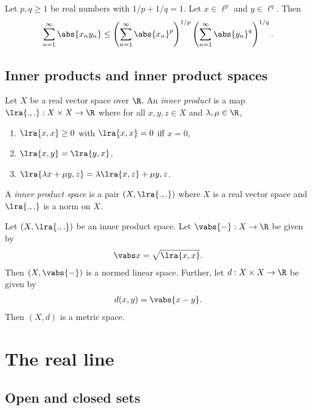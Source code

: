 \documentclass{article}
\begin{document}
\begin{lemma}
	Let $p,q\geq 1$ be real numbers with $1/p+1/q=1$. Let $x\in \ell^p$ and $y\in \ell^q$. Then
	\begin{align*}
		\sum_{n=1}^\infty \abs{x_ny_n}\leq
		\left(\sum_{n=1}^\infty\abs{x_n}^p\right)^{1/p}
		\left(\sum_{n=1}^\infty\abs{y_n}^q\right)^{1/q}.
	\end{align*}
\end{lemma}

\subsection{Inner products and inner product spaces}

\begin{definition}
	Let $X$ be a real vector space over $\R$. An \emph{inner product}
	is a map $\lra{.,.}:X\times X\to\R$ where for all $x,y,z\in X$ and
	$\lambda,\mu\in\R$,
	\begin{enumerate}
		\item $\lra{x,x}\geq 0$ with $\lra{x,x}=0$ iff $x=0$,
		\item $\lra{x,y}=\lra{y,x}$,
		\item $\lra{\lambda x+\mu y,z}=\lambda\lra{x,z}+\mu{y,z}$.
	\end{enumerate}
	A \emph{inner product space} is a pair $(X, \lra{.,.})$ where $X$ is a real
	vector space and $\lra{.,.}$ is a norm on $X$.
\end{definition}

\begin{lemma}
	Let $(X,\lra{.,.})$ be an inner product space. Let $\vabs{-}:X\to\R$ be given
	by
	\begin{align*}
		\vabs x = \sqrt{\lra{x,x}}.
	\end{align*}
	Then $(X,\vabs{-})$ is a normed linear space. Further, let $d:X\times X\to\R$
	be given by
	\begin{align*}
		d(x,y)=\vabs{x-y}.
	\end{align*}
	Then $(X,d)$ is a metric space.
\end{lemma}

\section{The real line}

\subsection{Open and closed sets}
\end{document}

